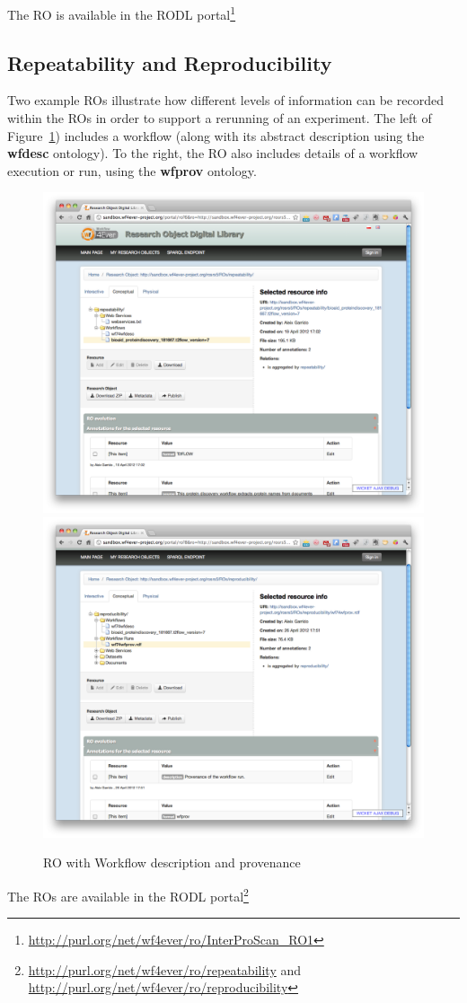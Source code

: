 The RO is available in the RODL portal\footnote{\url{http://purl.org/net/wf4ever/ro/InterProScan_RO1}}

\subsection{Repeatability and Reproducibility}

Two example ROs illustrate how different levels of information can be
recorded within the ROs in order to support a rerunning of an
experiment. The left of Figure~\ref{fig:repeat}) includes a workflow
(along with its abstract description using the \textbf{wfdesc}
ontology). To the right, the RO also includes details of a workflow
execution or run, using the \textbf{wfprov} ontology.

\begin{figure}[ht]
  \centering
  \includegraphics[width=\picwidth]{Figures/repeat}
  \includegraphics[width=\picwidth]{Figures/reproduce}
  \caption{RO with Workflow description and provenance}
  \label{fig:repeat}
\end{figure}

The ROs are available in the RODL
portal\footnote{\url{http://purl.org/net/wf4ever/ro/repeatability} and
  \url{http://purl.org/net/wf4ever/ro/reproducibility}}
